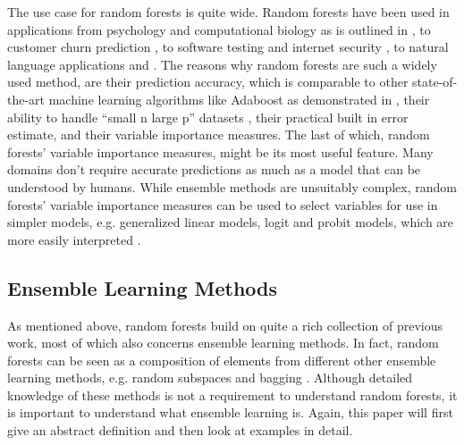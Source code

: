 \documentclass[a4paper,man,12pt,apacite,floatsintext,draftfirst]{apa6} %
\begin{document}
The use case for random forests is quite wide.
Random forests have been used in applications from psychology and
computational biology as is outlined in \cite{strobl2009introduction},
to customer churn prediction \cite{xie2009customer},
to software testing \cite{guo2004robust} and internet security
\cite{zhang2005network}, to natural language applications \cite{xu2004random}
and \cite{kobylinski2008definition}.
The reasons why random forests are such a widely used method,
are their prediction accuracy, which is comparable to other state-of-the-art
machine learning algorithms like Adaboost as demonstrated
in \cite{breiman2001random},
their ability to handle “small n large p” datasets \cite{strobl2009introduction},
their practical built in error estimate, and their variable importance measures.
The last of which, random forests' variable importance measures,
might be its most useful feature.
Many domains don't require accurate predictions as much as a model that can
be understood by humans.
While ensemble methods are unsuitably complex,
random forests' variable importance measures can be used to select variables
for use in simpler models, e.g.
generalized linear models, logit and probit models,
which are more easily interpreted \cite{strobl2009introduction}.

\subsection{Ensemble Learning Methods}
As mentioned above, random forests build on quite a rich collection of
previous work, most of which also concerns ensemble learning methods.
In fact, random forests can be seen as a composition of elements from
different other ensemble learning methods, e.g.
random subspaces \cite{ho1998random} and bagging \cite{breiman1996bagging}.
Although detailed knowledge of these methods is not a requirement to
understand random forests, it is important to understand what
ensemble learning is.
Again, this paper will first give an abstract definition and then look at
examples in detail.
\end{document}
